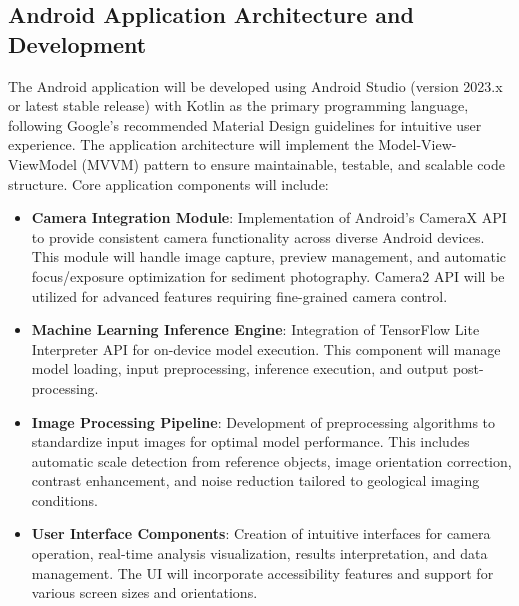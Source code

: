 \documentclass[project-plan]{report-template}
\begin{document}


\subsection{Android Application Architecture and Development}
The Android application will be developed using Android Studio (version 2023.x or latest stable release) with Kotlin as the primary programming language, following Google's recommended Material Design guidelines for intuitive user experience. The application architecture will implement the Model-View-ViewModel (MVVM) pattern to ensure maintainable, testable, and scalable code structure. Core application components will include:
\begin{itemize}
    \item \textbf{Camera Integration Module}: Implementation of Android's CameraX API to provide consistent camera functionality across diverse Android devices. This module will handle image capture, preview management, and automatic focus/exposure optimization for sediment photography. Camera2 API will be utilized for advanced features requiring fine-grained camera control.
\end{itemize}
\begin{itemize}
    \item \textbf{Machine Learning Inference Engine}: Integration of TensorFlow Lite Interpreter API for on-device model execution. This component will manage model loading, input preprocessing, inference execution, and output post-processing.
\end{itemize}
\begin{itemize}
    \item \textbf{Image Processing Pipeline}: Development of preprocessing algorithms to standardize input images for optimal model performance. This includes automatic scale detection from reference objects, image orientation correction, contrast enhancement, and noise reduction tailored to geological imaging conditions.
\end{itemize}
\begin{itemize}
    \item \textbf{User Interface Components}: Creation of intuitive interfaces for camera operation, real-time analysis visualization, results interpretation, and data management. The UI will incorporate accessibility features and support for various screen sizes and orientations.
\end{itemize}
\end{document}
